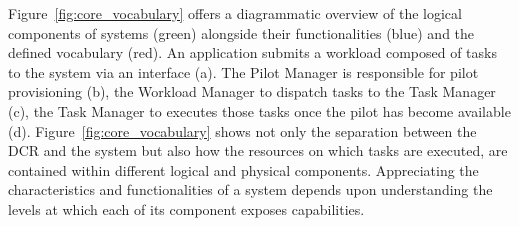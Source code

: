 \documentclass{sig-alternate}
\begin{document}


Figure~\ref{fig:core_vocabulary} offers a diagrammatic overview of the logical
components of \pilot systems (green) alongside their functionalities (blue) and
the defined vocabulary (red). An application submits a workload composed of
tasks to the \pilot system via an interface (a). The Pilot Manager is
responsible for pilot provisioning (b), the Workload Manager to dispatch tasks
to the Task Manager (c), the Task Manager to executes those tasks once the pilot
has become available (d). Figure~\ref{fig:core_vocabulary} shows not only the
separation between the DCR and the \pilot system but also how the resources on
which tasks are executed, are contained within different logical and physical
components. Appreciating the characteristics and functionalities of a
\pilot system depends upon understanding the levels at which each of
its component exposes capabilities.

\end{document}
